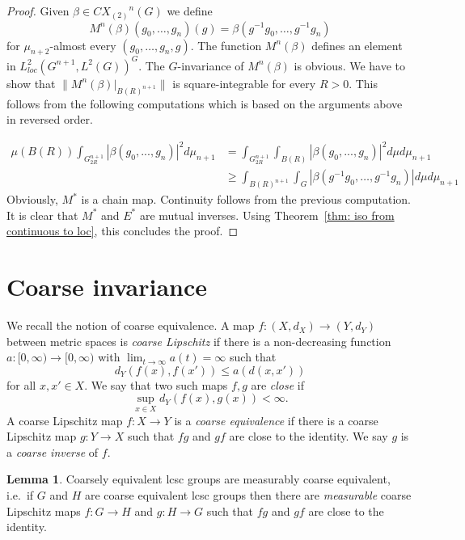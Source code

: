 \documentclass[10pt]{amsart}
\theoremstyle{plain}
\theoremstyle{definition}
\newtheorem{lem}[thm]{Lemma}
\theoremstyle{remark}
\begin{document}
\begin{proof}
Given $\beta\in {CX_{(2)}}^n(G)$ we define 
\[M^n(\beta)(g_0,\ldots, g_n)(g)=\beta(g^{-1}g_0, \ldots, g^{-1}g_n)\]
for $\mu_{n+2}$-almost every $(g_0,\ldots, g_n,g)$. The function 
$M^n(\beta)$ defines an element in ${L^2_{loc}}(G^{n+1}, L^2(G))^G$. The $G$-invariance of $M^n(\beta)$ is obvious. We have to show that $\|M^n(\beta)\vert_{B(R)^{n+1}}\|$ is square-integrable for every $R>0$. This  follows from the following computations which is based on the arguments above in reversed order. 

\begin{align*}
\mu(B(R))\int_{G_{2R}^{n+1}} |\beta(g_0,...,g_n)|^2 d\mu_{n+1}
	      & =\int_{G_{2R}^{n+1}}\int_{B(R)} |\beta(g_0,...,g_n)|^2 d\mu d\mu_{n+1}\\
	      & \ge\int_{B(R)^{n+1}}\int_G |\beta(g^{-1}g_0,\dots, g^{-1}g_n)|d\mu  d\mu_{n+1}
\end{align*}
Obviously, $M^\ast$ is a chain map. Continuity follows from the previous computation. It is clear that $M^\ast$ and $E^\ast$ are mutual inverses. Using 
Theorem~\ref{thm: iso from continuous to loc}, this concludes the proof. 
\end{proof}

\section{Coarse invariance}\label{sec: quasiisometry}
We recall the notion of coarse equivalence. A map $f\colon (X,d_X)\to (Y,d_Y)$ between metric spaces is \emph{coarse Lipschitz} if there 
is a non-decreasing function $a\colon [0,\infty)\to [0,\infty)$ with $\lim_{t\to\infty} a(t)=\infty$ such that 
\[ d_Y(f(x), f(x'))\le a(d(x,x'))\] 
for all $x,x'\in X$. We say that two such maps $f,g$ are \emph{close} 
if \[\sup_{x\in X} d_Y(f(x), g(x))<\infty.\]  
A coarse Lipschitz map $f\colon X\to Y$ is a \emph{coarse equivalence} if there is a coarse Lipschitz map $g\colon Y\to X$ such that $fg$ and $gf$ are close to the identity. We say $g$ is a \emph{coarse inverse} of $f$. 
\begin{lem}\label{coarse equivalences are measurable}
Coarsely equivalent lcsc groups are measurably coarse equivalent, i.e.~if $G$ and $H$ are coarse equivalent lcsc groups then there are \emph{measurable} coarse Lipschitz maps $f\colon G\to H$ and $g\colon H\to G$ such that $fg$ and $gf$ are close to the identity.
\end{lem}
\end{document}
